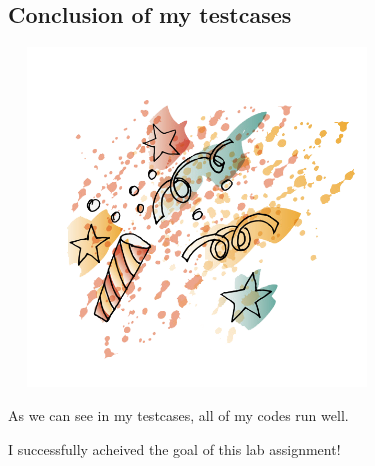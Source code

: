 \documentclass{article}
\begin{document}
\subsection*{Conclusion of my testcases}
\includegraphics[width = 10cm, height = 9cm]{happy.png}
\begin{description}
	\item As we can see in my testcases, all of my codes run well.
	\item I successfully acheived the goal of this lab assignment!
\end{description}
\end{document}
